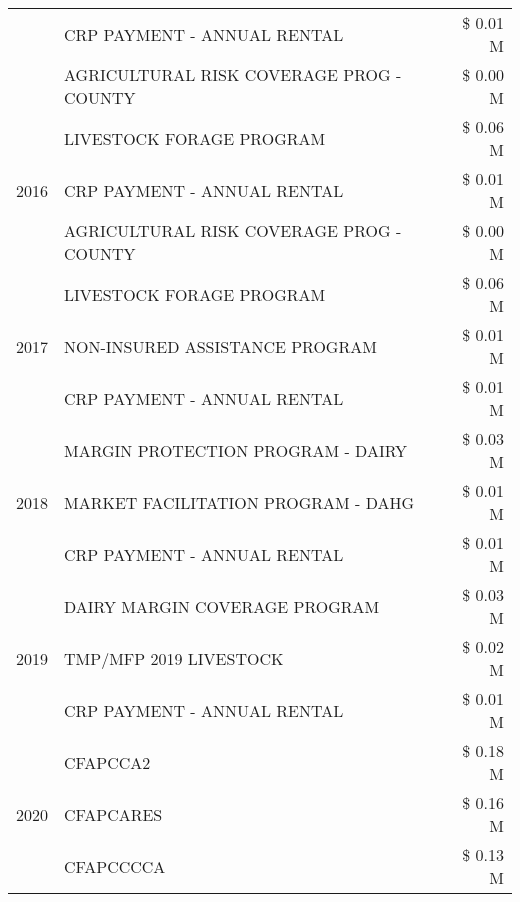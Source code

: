 \begin{tabular}{llr}
 & CRP PAYMENT - ANNUAL RENTAL & \$ 0.01 M \\
 & AGRICULTURAL RISK COVERAGE PROG - COUNTY & \$ 0.00 M \\
\cline{1-3}
\multirow[t]{3}{*}{2016} & LIVESTOCK FORAGE PROGRAM                      & \$ 0.06 M \\
 & CRP PAYMENT - ANNUAL RENTAL                   & \$ 0.01 M \\
 & AGRICULTURAL RISK COVERAGE PROG - COUNTY      & \$ 0.00 M \\
\cline{1-3}
\multirow[t]{3}{*}{2017} & LIVESTOCK FORAGE PROGRAM & \$ 0.06 M \\
 & NON-INSURED ASSISTANCE PROGRAM & \$ 0.01 M \\
 & CRP PAYMENT - ANNUAL RENTAL & \$ 0.01 M \\
\cline{1-3}
\multirow[t]{3}{*}{2018} & MARGIN PROTECTION PROGRAM - DAIRY & \$ 0.03 M \\
 & MARKET FACILITATION PROGRAM - DAHG & \$ 0.01 M \\
 & CRP PAYMENT - ANNUAL RENTAL & \$ 0.01 M \\
\cline{1-3}
\multirow[t]{3}{*}{2019} & DAIRY MARGIN COVERAGE PROGRAM & \$ 0.03 M \\
 & TMP/MFP 2019 LIVESTOCK & \$ 0.02 M \\
 & CRP PAYMENT - ANNUAL RENTAL & \$ 0.01 M \\
\cline{1-3}
\multirow[t]{3}{*}{2020} & CFAPCCA2 & \$ 0.18 M \\
 & CFAPCARES & \$ 0.16 M \\
 & CFAPCCCCA & \$ 0.13 M \\
\cline{1-3}
\bottomrule
\end{tabular}
